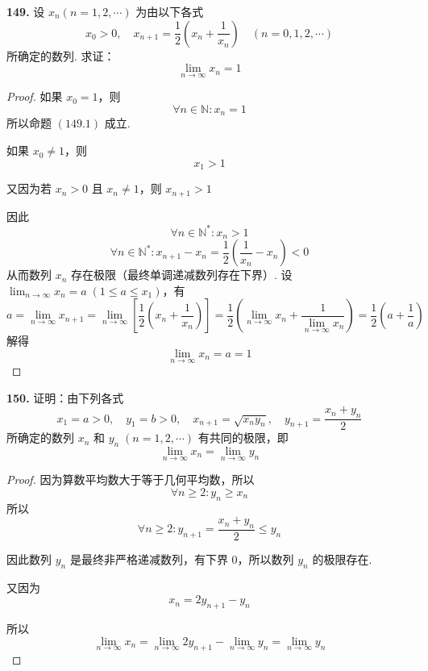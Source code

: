 \textbf{149.} 设 $x_n(n=1,2,\cdots)$ 为由以下各式
\[x_0 > 0, \quad x_{n+1} = \frac{1}{2}\left(x_n + \frac{1}{x_n}\right) \quad (n=0,1,2,\cdots)\]
所确定的数列. 求证：
\[\lim_{n \rightarrow \infty} x_n = 1 \tag{149.1}\]
\begin{proof}
    如果 $x_0 = 1$，则
    \[\forall n \in \mathbb{N}: x_n = 1\]
    所以命题 $(149.1)$ 成立.

    如果 $x_0 \neq 1$，则
    \[x_1 > 1\]
    
    又因为若 $x_n > 0$ 且 $x_n \neq 1$，则 $x_{n+1} > 1$

    因此
    \[\forall n \in \mathbb{N}^*: x_n > 1\]
    \[\forall n \in \mathbb{N}^*: x_{n+1} - x_n = \frac{1}{2}\left(\frac{1}{x_n} - x_n\right) < 0\]
    从而数列 $x_n$ 存在极限（最终单调递减数列存在下界）. 设 $\displaystyle \lim_{n \rightarrow \infty} x_n = a \;(1 \leqslant a \leqslant x_1)$，有
    \[a = \lim_{n \rightarrow \infty} x_{n+1} = \lim_{n \rightarrow \infty} \left[\frac{1}{2}\left(x_n + \frac{1}{x_n}\right)\right] = \frac{1}{2} \left( \lim_{n \rightarrow \infty} x_n + \frac{1}{\displaystyle \lim_{n \rightarrow \infty} x_n}\right) = \frac{1}{2}\left(a + \frac{1}{a}\right)\]
    解得
    \[\lim_{n \rightarrow \infty} x_n = a = 1\]
\end{proof}\vspace{9pt}

\textbf{150.} 证明：由下列各式
\[x_1 = a > 0, \quad y_1= b > 0, \quad x_{n+1} = \sqrt{x_ny_n}, \quad y_{n+1} = \frac{x_n + y_n}{2}\]
所确定的数列 $x_n$ 和 $y_n \; (n=1,2,\cdots)$ 有共同的极限，即
\[\lim_{n \rightarrow \infty} x_n = \lim_{n \rightarrow \infty} y_n\]
\begin{proof}
    因为算数平均数大于等于几何平均数，所以
    \[\forall n \geqslant 2: y_n \geqslant x_n\]
    所以
    \[\forall n \geqslant 2: y_{n+1} = \frac{x_n + y_n}{2} \leqslant y_n\]

    因此数列 $y_n$ 是最终非严格递减数列，有下界 0，所以数列 $y_n$ 的极限存在.

    又因为
    \[x_n = 2y_{n+1} - y_n\]

    所以
    \[\lim_{n \rightarrow \infty} x_n = \lim_{n \rightarrow \infty} 2y_{n+1} - \lim_{n \rightarrow \infty} y_n = \lim_{n \rightarrow \infty} y_n\]
\end{proof}\vspace{9pt}


